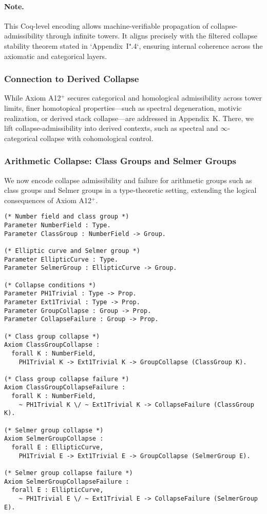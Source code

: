 \documentclass[11pt]{article}
\begin{document}
\paragraph{Note.}
This Coq-level encoding allows machine-verifiable propagation of collapse-admissibility through infinite towers. It aligns precisely with the filtered collapse stability theorem stated in `Appendix~I⁺.4`, ensuring internal coherence across the axiomatic and categorical layers.

\subsubsection*{Connection to Derived Collapse}

While Axiom A12$^{+}$ secures categorical and homological admissibility across tower limits, finer homotopical properties—such as spectral degeneration, motivic realization, or derived stack collapse—are addressed in Appendix~K. There, we lift collapse-admissibility into derived contexts, such as spectral and $\infty$-categorical collapse with cohomological control.

\subsubsection*{Arithmetic Collapse: Class Groups and Selmer Groups}

We now encode collapse admissibility and failure for arithmetic groups such as class groups and Selmer groups in a type-theoretic setting, extending the logical consequences of Axiom A12$^+$.

\begin{lstlisting}[language=Coq, caption=Collapse Admissibility for Class and Selmer Groups]
(* Number field and class group *)
Parameter NumberField : Type.
Parameter ClassGroup : NumberField -> Group.

(* Elliptic curve and Selmer group *)
Parameter EllipticCurve : Type.
Parameter SelmerGroup : EllipticCurve -> Group.

(* Collapse conditions *)
Parameter PH1Trivial : Type -> Prop.
Parameter Ext1Trivial : Type -> Prop.
Parameter GroupCollapse : Group -> Prop.
Parameter CollapseFailure : Group -> Prop.

(* Class group collapse *)
Axiom ClassGroupCollapse :
  forall K : NumberField,
    PH1Trivial K -> Ext1Trivial K -> GroupCollapse (ClassGroup K).

(* Class group collapse failure *)
Axiom ClassGroupCollapseFailure :
  forall K : NumberField,
    ~ PH1Trivial K \/ ~ Ext1Trivial K -> CollapseFailure (ClassGroup K).

(* Selmer group collapse *)
Axiom SelmerGroupCollapse :
  forall E : EllipticCurve,
    PH1Trivial E -> Ext1Trivial E -> GroupCollapse (SelmerGroup E).

(* Selmer group collapse failure *)
Axiom SelmerGroupCollapseFailure :
  forall E : EllipticCurve,
    ~ PH1Trivial E \/ ~ Ext1Trivial E -> CollapseFailure (SelmerGroup E).
\end{lstlisting}
\end{document}
